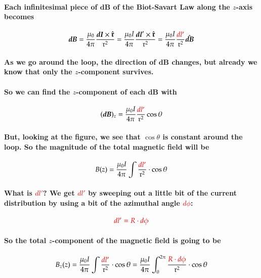 \documentclass{article}
\begin{document}
\paragraph{Each infinitesimal piece of $\boldsymbol{dB}$ of the Biot-Savart Law along the $z$-axis becomes}
\begin{equation*}
    \boldsymbol{dB}=\frac{\mu_0}{4\pi}\frac{\boldsymbol{dI}\times\hat{\boldsymbol{\mathfrak{r}}}}{\mathfrak{r}^2}=\frac{\mu_0I}{4\pi}\frac{\boldsymbol{dl}'\times\hat{\boldsymbol{\mathfrak{r}}}}{\mathfrak{r}^2}=\frac{\mu_0I}{4\pi}\frac{\textcolor{red}{dl'}}{\mathfrak{r}^2}\hat{\boldsymbol{dB}}
\end{equation*}
\paragraph{As we go around the loop, the direction of $\boldsymbol{dB}$ changes, but already we know that only the $z$-component survives.}
\paragraph{So we can find the $z$-component of each $\boldsymbol{dB}$ with}
\begin{equation*}
    (\boldsymbol{dB})_z=\frac{\mu_0I}{4\pi}\frac{\textcolor{red}{dl'}}{\mathfrak{r}^2}\cos\theta
\end{equation*}
\paragraph{But, looking at the figure, we see that $\cos\theta$ is constant around the loop. So the magnitude of the total magnetic field will be }
\begin{equation*}
    B(z)=\frac{\mu_0I}{4\pi}\int\frac{\textcolor{red}{dl'}}{\mathfrak{r}^2}\cdot\cos\theta
\end{equation*}
\paragraph{What is \textcolor{red}{$dl'$}? We get \textcolor{red}{$dl'$} by sweeping out a little bit of the current distribution by using a bit of the azimuthal angle \textcolor{red}{$d\phi$}:}
\begin{equation*}
    \textcolor{red}{dl'=R\cdot d\phi}
\end{equation*}
\paragraph{So the total $z$-component of the magnetic field is going to be}
\begin{equation*}
    B_z(z)=\frac{\mu_0I}{4\pi}\int\frac{\textcolor{red}{dl'}}{\mathfrak{r}^2}\cdot \cos\theta=\frac{\mu_0I}{4\pi}\int_0^{2\pi}\frac{\textcolor{red}{R\cdot d\phi}}{\mathfrak{r}^2}\cdot \cos\theta
\end{equation*}
\end{document}
